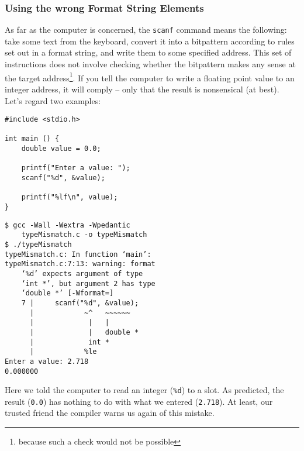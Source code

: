 \subsubsection{Using the wrong Format String Elements}
As far as the computer is concerned, the \texttt{scanf} command means the following: take some text from the keyboard, convert it into a bitpattern according to rules set out in a format string, and write them to some specified address. This set of instructions does not involve checking whether the bitpattern makes any sense at the target address\footnote{because such a check would not be possible}. If you tell the computer to write a floating point value to an integer address, it will comply -- only that the result is nonsensical (at best). Let's regard two examples:
\begin{tcbraster}[raster columns=2,
                  raster equal height,
                  nobeforeafter,
                  raster column skip=0.2cm]
\begin{warnbox}[typeMismatch.c, leftupper=7mm]
\begin{verbatim}
#include <stdio.h>

int main () {
    double value = 0.0;
    
    printf("Enter a value: "); 
    scanf("%d", &value);
    
    printf("%lf\n", value);
}
\end{verbatim}
\end{warnbox}
%
\begin{cmdbox}
\begin{verbatim}
$ gcc -Wall -Wextra -Wpedantic 
    typeMismatch.c -o typeMismatch
$ ./typeMismatch
typeMismatch.c: In function ‘main’:
typeMismatch.c:7:13: warning: format 
    ‘%d’ expects argument of type 
    ‘int *’, but argument 2 has type 
    ‘double *’ [-Wformat=]
    7 |     scanf("%d", &value);
      |            ~^   ~~~~~~
      |             |   |
      |             |   double *
      |             int *
      |            %le
Enter a value: 2.718 
0.000000
\end{verbatim}
\end{cmdbox}
\end{tcbraster}
Here we told the computer to read an integer (\texttt{\%d}) to a  slot. As predicted, the result (\texttt{0.0}) has nothing to do with what we entered (\texttt{2.718}). At least, our trusted friend the compiler warns us again of this mistake.

